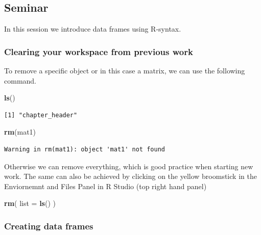 \documentclass[]{article}
\newenvironment{Shaded}{\begin{snugshade}}{\end{snugshade}}
\newcommand{\DataTypeTok}[1]{\textcolor[rgb]{0.13,0.29,0.53}{#1}}
\newcommand{\KeywordTok}[1]{\textcolor[rgb]{0.13,0.29,0.53}{\textbf{#1}}}
\newcommand{\NormalTok}[1]{#1}
\begin{document}
\hypertarget{seminar-1}{%
\subsection{Seminar}\label{seminar-1}}

In this session we introduce data frames using R-syntax.

\hypertarget{clearing-your-workspace-from-previous-work}{%
\subsubsection{Clearing your workspace from previous work}\label{clearing-your-workspace-from-previous-work}}

To remove a specific object or in this case a matrix, we can use the following command.

\begin{Shaded}
\begin{Highlighting}[]
\KeywordTok{ls}\NormalTok{()}
\end{Highlighting}
\end{Shaded}

\begin{verbatim}
[1] "chapter_header"
\end{verbatim}

\begin{Shaded}
\begin{Highlighting}[]
\KeywordTok{rm}\NormalTok{(mat1)}
\end{Highlighting}
\end{Shaded}

\begin{verbatim}
Warning in rm(mat1): object 'mat1' not found
\end{verbatim}

Otherwise we can remove everything, which is good practice when starting new work. The same can also be achieved by clicking on the yellow broomstick in the Enviornemnt and Files Panel in R Studio (top right hand panel)

\begin{Shaded}
\begin{Highlighting}[]
\KeywordTok{rm}\NormalTok{( }\DataTypeTok{list =} \KeywordTok{ls}\NormalTok{() )}
\end{Highlighting}
\end{Shaded}

\hypertarget{creating-data-frames}{%
\subsubsection{Creating data frames}\label{creating-data-frames}}
\end{document}
